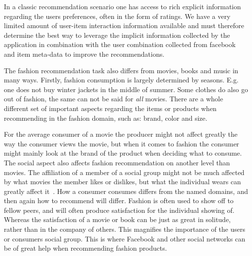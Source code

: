 In a classic recommendation scenario one has access to rich explicit
information regarding the users preferences, often in the form of ratings. We
have a very limited amount of user-item interaction information available and
must therefore determine the best way to leverage the implicit information
collected by the application in combination with the user combination collected
from facebook and item meta-data to improve the recommendations.

The fashion recommendation task also differs from movies, books and music in
many ways.  Firstly, fashion consumption is largely determined by seasons.
E.g. one does not buy winter jackets in the middle of summer.  Some clothes do
also go out of fashion, the same can not be said for \emph{all} movies.  There
are a whole different set of important aspects regarding the items or products
when recommending in the fashion domain, such as: brand, color and size.

For the average consumer of a movie the producer might not affect greatly the
way the consumer views the movie, but when it comes to fashion the consumer
might mainly look at the brand of the product when deciding what to consume.
The social aspect also affects fashion recommendation on another level than
movies.
The affiliation of a member of a social group might not be much affected by
what movies the member likes or dislikes, but what the individual wears can
greatly affect it~\cite{vignali2009fashion}.
How a consumer consumes differs from the named domains, and then again how to
recommend will differ.  Fashion is often used to show off to fellow peers, and
will often produce satisfaction for the individual showing of.
Whereas the satisfaction of a movie or book can be just as great in solitude,
rather than in the company of others.  This magnifies the importance of the
users or consumers social group.  This is where Facebook and other social
networks can be of great help when recommending fashion products.


